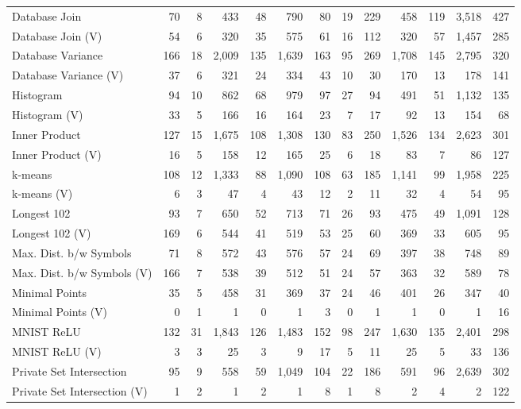 \begin{table*}[htbp]
\begin{tabular}{lrrrrrrrrrrrr}
            Database Join & 70 & 8 & 433 & 48 & 790 & 80 & 19 & 229 & 458 & 119 & 3,518 & 427\\
            Database Join (V) & 54 & 6 & 320 & 35 & 575 & 61 & 16 & 112 & 320 & 57 & 1,457 & 285\\
            \midrule
            Database Variance & 166 & 18 & 2,009 & 135 & 1,639 & 163 & 95 & 269 & 1,708 & 145 & 2,795 & 320\\
            Database Variance (V) & 37 & 6 & 321 & 24 & 334 & 43 & 10 & 30 & 170 & 13 & 178 & 141\\
            \midrule
            Histogram & 94 & 10 & 862 & 68 & 979 & 97 & 27 & 94 & 491 & 51 & 1,132 & 135\\
            Histogram (V) & 33 & 5 & 166 & 16 & 164 & 23 & 7 & 17 & 92 & 13 & 154 & 68\\
            \midrule
            Inner Product & 127 & 15 & 1,675 & 108 & 1,308 & 130 & 83 & 250 & 1,526 & 134 & 2,623 & 301\\
            Inner Product (V) & 16 & 5 & 158 & 12 & 165 & 25 & 6 & 18 & 83 & 7 & 86 & 127\\
            \midrule
            k-means & 108 & 12 & 1,333 & 88 & 1,090 & 108 & 63 & 185 & 1,141 & 99 & 1,958 & 225\\
            k-means (V) & 6 & 3 & 47 & 4 & 43 & 12 & 2 & 11 & 32 & 4 & 54 & 95\\
            \midrule
            Longest 102 & 93 & 7 & 650 & 52 & 713 & 71 & 26 & 93 & 475 & 49 & 1,091 & 128\\
            Longest 102 (V) & 169 & 6 & 544 & 41 & 519 & 53 & 25 & 60 & 369 & 33 & 605 & 95\\
            \midrule
            Max. Dist. b/w Symbols & 71 & 8 & 572 & 43 & 576 & 57 & 24 & 69 & 397 & 38 & 748 & 89\\
            Max. Dist. b/w Symbols (V) & 166 & 7 & 538 & 39 & 512 & 51 & 24 & 57 & 363 & 32 & 589 & 78\\
            \midrule
            Minimal Points & 35 & 5 & 458 & 31 & 369 & 37 & 24 & 46 & 401 & 26 & 347 & 40\\
            Minimal Points (V) & 0 & 1 & 1 & 0 & 1 & 3 & 0 & 1 & 1 & 0 & 1 & 16\\
            \midrule
            MNIST ReLU & 132 & 31 & 1,843 & 126 & 1,483 & 152 & 98 & 247 & 1,630 & 135 & 2,401 & 298\\
            MNIST ReLU (V) & 3 & 3 & 25 & 3 & 9 & 17 & 5 & 11 & 25 & 5 & 33 & 136\\
            \midrule
            Private Set Intersection & 95 & 9 & 558 & 59 & 1,049 & 104 & 22 & 186 & 591 & 96 & 2,639 & 302\\
            Private Set Intersection (V) & 1 & 2 & 1 & 2 & 1 & 8 & 1 & 8 & 2 & 4 & 2 & 122\\
          \bottomrule
       \end{tabular}
       \label{table:metrics}
   \end{table*}


